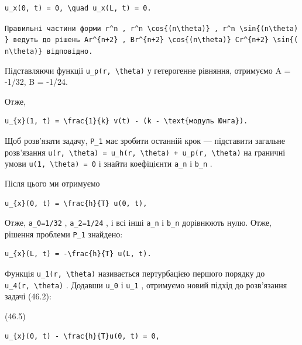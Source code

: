 \documentclass[
  ukrainian,
]{article}
\begin{document}
\begin{verbatim}
u_x(0, t) = 0, \quad u_x(L, t) = 0.
\end{verbatim}

\texttt{Правильні\ частини\ форми\ \textquotesingle{}r\^{}n\textquotesingle{}\ ,\ \textquotesingle{}r\^{}n\ \textbackslash{}cos\{(n\textbackslash{}theta)\}\textquotesingle{}\ ,\ \textquotesingle{}r\^{}n\ \textbackslash{}sin\{(n\textbackslash{}theta)\}\textquotesingle{}\ ведуть\ до\ рішень\ \textquotesingle{}Ar\^{}\{n+2\}\textquotesingle{}\ ,\ \textquotesingle{}Br\^{}\{n+2\}\ \textbackslash{}cos\{(n\textbackslash{}theta)\}\textquotesingle{}\ \textquotesingle{}Cr\^{}\{n+2\}\ \textbackslash{}sin\{(n\textbackslash{}theta)\}\textquotesingle{}\ відповідно.}

Підставляючи функції \texttt{u\_p(r,\ \textbackslash{}theta)} у
гетерогенне рівняння, отримуємо A = -1/32, B = -1/24.

Отже,

\begin{verbatim}
u_{x}(1, t) = \frac{1}{k} v(t) - (k - \text{модуль Юнга}).
\end{verbatim}

Щоб розв'язати задачу, \texttt{P\_1} має зробити останній крок ---
підставити загальне розв'язання
\texttt{u(r,\ \textbackslash{}theta)\ =\ u\_h(r,\ \textbackslash{}theta)\ +\ u\_p(r,\ \textbackslash{}theta)}
на граничні умови \texttt{u(1,\ \textbackslash{}theta)\ =\ 0} і знайти
коефіцієнти \texttt{a\_n} і \texttt{b\_n} .

Після цього ми отримуємо

\begin{verbatim}
u_{x}(0, t) = \frac{h}{T} u(0, t),
\end{verbatim}

Отже, \texttt{a\_0=1/32} , \texttt{a\_2=1/24} , і всі інші \texttt{a\_n}
і \texttt{b\_n} дорівнюють нулю. Отже, рішення проблеми \texttt{P\_1}
знайдено:

\begin{verbatim}
u_{x}(L, t) = -\frac{h}{T} u(L, t).
\end{verbatim}

Функція \texttt{u\_1(r,\ \textbackslash{}theta)} називається
пертурбацією першого порядку до \texttt{u\_4(r,\ \textbackslash{}theta)}
. Додавши \texttt{u\_0} і \texttt{u\_1} , отримуємо новий підхід до
розв'язання задачі (46.2):

(46.5)

\begin{verbatim}
u_{x}(0, t) - \frac{h}{T}u(0, t) = 0,
\end{verbatim}
\end{document}
